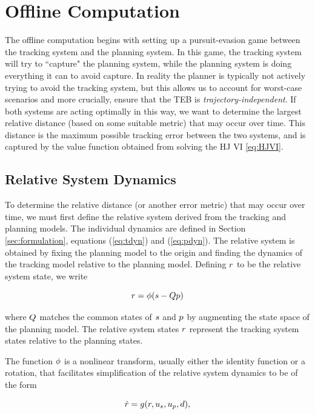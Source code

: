 \section{Offline Computation \label{sec:precomp}}
The offline computation begins with setting up a pursuit-evasion game \cite{Huang11, Chen17} between the tracking system and the planning system. 
In this game, the tracking system will try to ``capture" the planning system, while the planning system is doing everything it can to avoid capture. 
In reality the planner is typically not actively trying to avoid the tracking system, but this allows us to account for worst-case scenarios and more crucially, ensure that the TEB is \textit{trajectory-independent}. 
If both systems are acting optimally in this way, we want to determine the largest relative distance (based on some suitable metric) that may occur over time. 
This distance is the maximum possible tracking error between the two systems, and is captured by the value function obtained from solving the HJ VI \eqref{eq:HJVI}.

\subsection{Relative System Dynamics}
To determine the relative distance (or another error metric) that may occur over time, we must first define the relative system derived from the tracking and planning models. 
The individual dynamics are defined in Section \ref{sec:formulation}, equations (\ref{eq:tdyn}) and (\ref{eq:pdyn}). 
The relative system is obtained by fixing the planning model to the origin and finding the dynamics of the tracking model relative to the planning model.
Defining $r$ to be the relative system state, we write

\begin{equation}
\label{eq:rstate}
\rstate = \rtrans(\tstate - \ptmat\pstate)
\end{equation}

\noindent where $Q$ matches the common states of $s$ and $p$ by augmenting the state space of the planning model.
The relative system states $r$ represent the tracking system states relative to the planning states.

The function $\phi$ is a nonlinear transform, usually either the identity function or a rotation, that facilitates simplification of the relative system dynamics to be of the form

\begin{equation}
\label{eq:rdyn}
\dot\rstate = \rdyn(\rstate, \tctrl, \pctrl, \dstb),
\end{equation}

